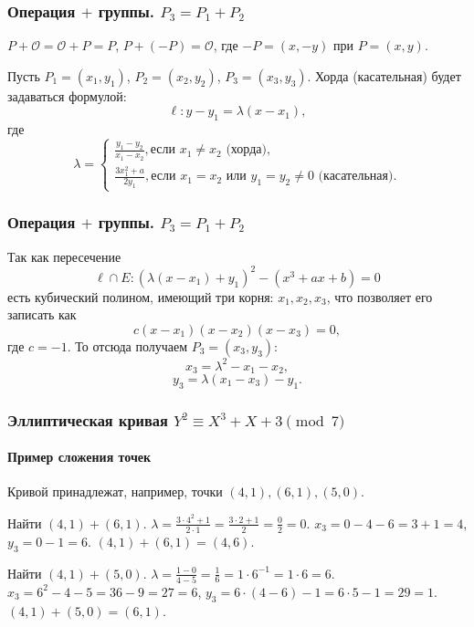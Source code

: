 \begin{frame}
    \frametitle{Операция $+$ группы. $P_3=P_1+P_2$}

    $P+\mathcal{O}=\mathcal{O}+P=P$, $P+(-P)=\mathcal{O}$, где $-P=(x,-y)$ при $P=(x,y)$.
    
    Пусть $P_1=(x_1, y_1)$, $P_2=(x_2, y_2)$, $P_3=(x_3, y_3)$. Хорда (касательная) будет задаваться формулой:
    \[\ell:y-y_1=\lambda(x-x_1),\]
    где 
    \[
        \lambda = 
        \begin{cases}
            \displaystyle
            \frac{y_1-y_2}{x_1-x_2},\text{если $x_1\neq x_2$ (хорда)},\\
            \displaystyle
            \frac{3x_1^2+a}{2y_1},\text{если $x_1=x_2$ или $y_1=y_2\neq 0$ (касательная)}.
        \end{cases}
    \]
\end{frame}


\begin{frame}
    \frametitle{Операция $+$ группы. $P_3=P_1+P_2$}
    Так как пересечение 
    \[
        \ell\cap E:(\lambda(x-x_1)+y_1)^2-(x^3+ax+b)=0
    \]
    есть кубический полином, имеющий три корня: $x_1,x_2,x_3$, что позволяет его записать как
    \[
        c(x-x_1)(x-x_2)(x-x_3)=0,
    \] где $c=-1$. То отсюда получаем $P_3=(x_3,y_3)$:
    \[x_3=\lambda^2-x_1-x_2,\]
    \[y_3=\lambda(x_1-x_3)-y_1.\]
\end{frame}


\begin{frame}
    \frametitle{Эллиптическая кривая $Y^2\equiv X^3+X+3\pmod{7}$}
    \framesubtitle{Пример сложения точек}
    
    Кривой принадлежат, например, точки $(4,1), (6,1), (5,0)$.
    \begin{example}
        Найти $(4,1)+(6,1)$. $\lambda=\frac{3\cdot 4^2+1}{2\cdot 1}=\frac{3\cdot 2 + 1}{2}=\frac{0}{2}=0$. $x_3=0-4-6=3+1=4$, $y_3=0-1=6$. $(4,1)+(6,1)=(4,6)$.
    \end{example}
    
    \begin{example}
        Найти $(4,1)+(5,0)$. $\lambda=\frac{1-0}{4-5}=\frac{1}{6}=1\cdot 6^{-1}=1\cdot 6=6$. $x_3=6^2-4-5=36-9=27=6$, $y_3=6\cdot(4-6)-1=6\cdot 5-1=29=1$. $(4,1)+(5,0)=(6,1)$.
    \end{example}
\end{frame}


